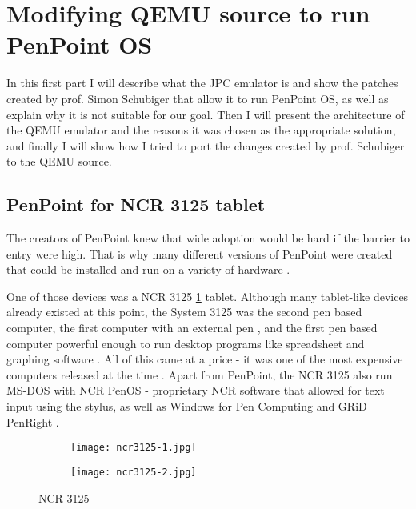 \clearpage %

\section{Modifying QEMU source to run PenPoint OS}

In this first part I will describe what the JPC emulator is and show the
patches created by prof. Simon Schubiger that allow it to run PenPoint OS, as
well as explain why it is not suitable for our goal. Then I will present the
architecture of the QEMU emulator and the reasons it was chosen as the
appropriate solution, and finally I will show how I tried to port the changes
created by prof. Schubiger to the QEMU source.

\subsection{PenPoint for NCR 3125 tablet}

The creators of PenPoint knew that wide adoption would be hard if the barrier
to entry were high. That is why many different versions of PenPoint were created
that could be installed and run on a variety of hardware \cite{carr1991}.

One of those devices was a NCR 3125 \ref{fig:ncr3125} tablet. Although many
tablet-like devices already existed at this point, the System 3125 was the
second pen based computer, the first computer with an external pen
\cite{hohl2014}, and the first pen based computer powerful enough to run
desktop programs like spreadsheet and graphing software \cite{mcdonald2011}.
All of this came at a price - it was one of the most expensive computers
released at the time \cite{hohl2014}. Apart from PenPoint, the NCR 3125 also run
MS-DOS with NCR PenOS - proprietary NCR software that allowed for text input
using the stylus, as well as Windows for Pen Computing and GRiD PenRight
\cite{stengel}.

\begin{figure}[!h]
    \centering
    \begin{subfigure}[b]{0.55\linewidth}
        \texttt{[image: ncr3125-1.jpg]}
    \end{subfigure}
    \hfill
    \begin{subfigure}[b]{0.35\linewidth}
        \texttt{[image: ncr3125-2.jpg]}
    \end{subfigure}
    \caption{NCR 3125}
    \label{fig:ncr3125}
\end{figure}

